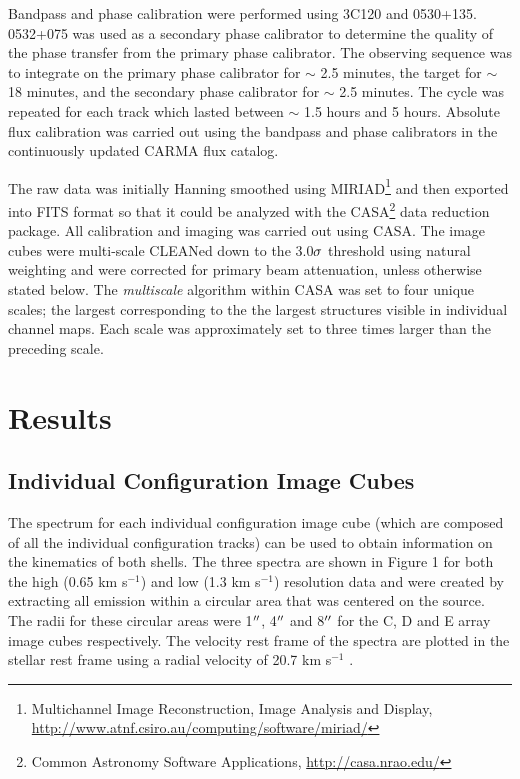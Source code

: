 \documentclass[manuscript]{aastex}
\begin{document}
Bandpass and phase calibration were performed using 3C120 and 0530+135. 0532+075 was used as a secondary phase calibrator to determine the quality of the phase transfer from the primary phase calibrator. The observing sequence was to integrate on the primary phase calibrator for $\sim$ 2.5 minutes, the target for $\sim$ 18 minutes, and the secondary phase calibrator for $\sim$ 2.5 minutes. The cycle was repeated for each track which lasted between $\sim$ 1.5 hours and 5 hours. Absolute flux calibration was carried out using the bandpass and phase calibrators in the continuously updated CARMA flux catalog.

The raw data was initially Hanning smoothed using MIRIAD\footnote{Multichannel Image Reconstruction, Image Analysis and Display, \url{http://www.atnf.csiro.au/computing/software/miriad/}} and then exported into FITS format so that it could be analyzed with the CASA\footnote{Common Astronomy Software Applications, \url{http://casa.nrao.edu/}} data reduction package. All calibration and imaging was carried out using CASA. The image cubes  were multi-scale  CLEANed down to the 3.0$\rm{\sigma}$ threshold using natural weighting and were corrected for primary beam attenuation, unless otherwise stated below. The \textit{multiscale} algorithm \citep{rich08} within CASA was set to four unique scales; the largest corresponding to the the largest structures visible in individual channel maps. Each scale was approximately set to three times larger than the preceding scale. 
\section{Results} 

\subsection{Individual Configuration Image Cubes} \label{results1} %

The spectrum for each individual configuration image cube (which are composed of all the individual configuration tracks) can be used to obtain information on the kinematics of both shells. The three spectra are shown in Figure 1 for both the high (0.65 km s${}^{-1}$) and low (1.3 km s${}^{-1}$) resolution data and were created by extracting all emission within a circular area that was centered on the source. The radii for these circular areas were 1$\mbox{$^{\prime\prime}$}$, 4$\mbox{$^{\prime\prime}$}$ and 8$\mbox{$^{\prime\prime}$}$ for the C, D and E array image cubes respectively. The velocity rest frame of the spectra are plotted in the stellar rest frame using a radial velocity of 20.7 km s${}^{-1}$ \citep{harp08}.
\end{document}
